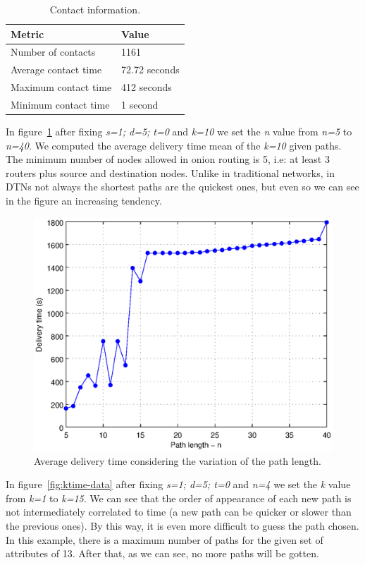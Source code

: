 \begin{table}[h]
\centering
\begin{tabular}{l|l}
Metric & Value \\
\hline
Number of contacts & 1161 \\
Average contact time  & 72.72 seconds \\
Maximum contact time &  412 seconds\\
Minimum contact time &  1 second
\end{tabular}
\caption{Contact information.}
\label{table:contact-information}
\end{table}

In figure~\ref{fig:ntime-data} after fixing \textit{s=1; d=5; t=0} and \textit{k=10} we set the \textit{n} value from \textit{n=5} to \textit{n=40}. We computed the average delivery time mean of the \textit{k=10} given paths. The minimum number of nodes allowed in onion routing is 5, i.e: at least 3 routers plus source and destination nodes. Unlike in traditional networks, in DTNs not always the shortest paths are the quickest ones, but even so we can see in the figure an increasing tendency.

\begin{figure}[hbt]
  \centering
  \includegraphics[scale=0.70]{imgs/statistics/ntime-data}
  \caption{Average delivery time considering the variation of the path length.}
  \label{fig:ntime-data}
\end{figure}

In figure~\ref{fig:ktime-data} after fixing \textit{s=1; d=5; t=0} and \textit{n=4} we set the \textit{k} value from \textit{k=1} to \textit{k=15}. We can see that the order of appearance of each new path is not intermediately correlated to time (a new path can be quicker or slower than the previous ones). By this way, it is even more difficult to guess the path chosen. In this example, there is a maximum number of paths for the given set of attributes of 13. After that, as we can see, no more paths will be gotten.

